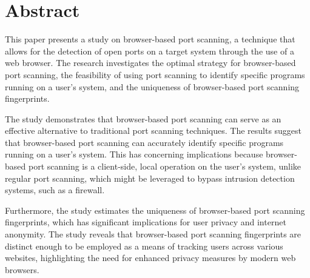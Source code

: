 \chapter*{Abstract}

This paper presents a study on browser-based port scanning, a technique that allows for the detection of open ports on a target system through the use of a web browser. The research investigates the optimal strategy for browser-based port scanning, the feasibility of using port scanning to identify specific programs running on a user's system, and the uniqueness of browser-based port scanning fingerprints.

The study demonstrates that browser-based port scanning can serve as an effective alternative to traditional port scanning techniques. The results suggest that browser-based port scanning can accurately identify specific programs running on a user's system. This has concerning implications because browser-based port scanning is a client-side, local operation on the user's system, unlike regular port scanning, which might be leveraged to bypass intrusion detection systems, such as a firewall.

Furthermore, the study estimates the uniqueness of browser-based port scanning fingerprints, which has significant implications for user privacy and internet anonymity. The study reveals that browser-based port scanning fingerprints are distinct enough to be employed as a means of tracking users across various websites, highlighting the need for enhanced privacy measures by modern web browsers.  